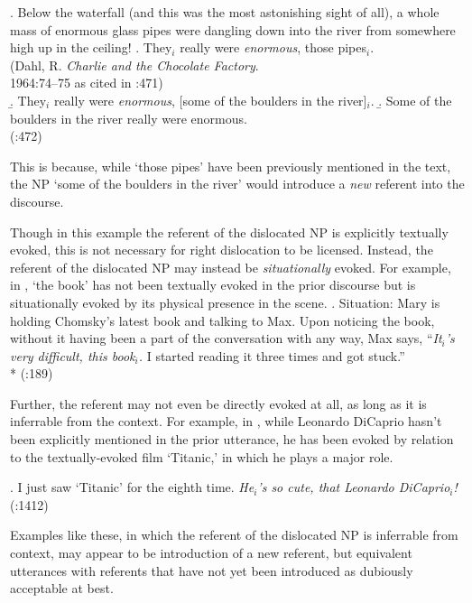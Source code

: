 \documentclass[titlepage,12pt]{article}
\def\infelic{{\leavevmode\llap{\#}}}
\begin{document}
\ex. Below the waterfall (and this was the most astonishing sight of all), a whole mass of enormous glass pipes were dangling down into the river from somewhere high up in the ceiling!
\a. They$_i$ really were \emph{enormous}, those pipes$_i$. \\
\phantom{x}\hfill (Dahl, R. \textit{Charlie and the Chocolate Factory}.\\\phantom{x}\hfill 1964:74--75 as cited in \citealt{ward_discourse_1996}:471)\\
\b. \infelic They$_i$ really were \emph{enormous}, [some of the boulders in the river]$_i$.
\b. Some of the boulders in the river really were enormous.\\
\phantom{x}\hfill (\citealt{ward_discourse_1996}:472)

This is because,  while `those pipes' have been previously mentioned in the text, the NP `some of the boulders in the river' would introduce a \emph{new} referent into the discourse.

Though in this example the referent of the dislocated NP is explicitly textually evoked, this is not necessary for right dislocation to be licensed. Instead, the referent of the dislocated NP may instead be \emph{situationally} evoked. For example, in \Next, `the book' has not been textually evoked in the prior discourse but is situationally evoked by its physical presence in the scene.
\newpage
\ex. Situation: Mary is holding Chomsky's latest book and talking to Max. Upon noticing the book, without it having been a part of the conversation with any way, Max says,
``\textit{It$_i$'s very difficult, this book$_i$.} I started reading it three times and got stuck.''\\*
\phantom{x}\hfill (\citealt{ziv_right_1994}:189)

Further, the referent may not even be directly evoked at all, as long as it is inferrable from the context. For example, in \Next, while Leonardo DiCaprio hasn't been explicitly mentioned in the prior utterance, he has been evoked by relation to the textually-evoked film `Titanic,' in which he plays a major role.

\ex. I just saw `Titanic' for the eighth time. \textit{He$_i$'s so cute, that Leonardo DiCaprio$_i$!}\\
\phantom{z}\hfill (\citealt{huddleston_cambridge_2002}:1412)

Examples like these, in which the referent of the dislocated NP is inferrable from context, may appear to be introduction of a new referent, but equivalent utterances with referents that have not yet been introduced as dubiously acceptable at best. 
\end{document}
